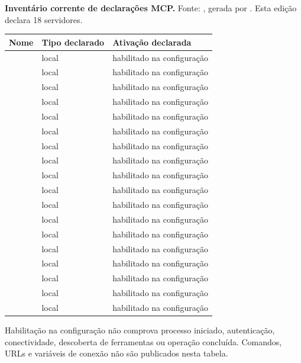 \clearpage
\begin{resultado}
\textbf{Inventário corrente de declarações MCP.} Fonte: ,
gerada por . Esta edição declara 18 servidores.
{\footnotesize\begin{tabularx}{\textwidth}{YYY}
\toprule Nome & Tipo declarado & Ativação declarada \\ \midrule
{} & local & habilitado na configuração \\
 & local & habilitado na configuração \\
 & local & habilitado na configuração \\
 & local & habilitado na configuração \\
 & local & habilitado na configuração \\
 & local & habilitado na configuração \\
 & local & habilitado na configuração \\
 & local & habilitado na configuração \\
 & local & habilitado na configuração \\
 & local & habilitado na configuração \\
 & local & habilitado na configuração \\
 & local & habilitado na configuração \\
 & local & habilitado na configuração \\
 & local & habilitado na configuração \\
 & local & habilitado na configuração \\
 & local & habilitado na configuração \\
 & local & habilitado na configuração \\
 & local & habilitado na configuração \\
\bottomrule\end{tabularx}}
Habilitação na configuração não comprova processo iniciado, autenticação, conectividade, descoberta de ferramentas ou operação concluída. Comandos, URLs e variáveis de conexão não são publicados nesta tabela.
\end{resultado}

